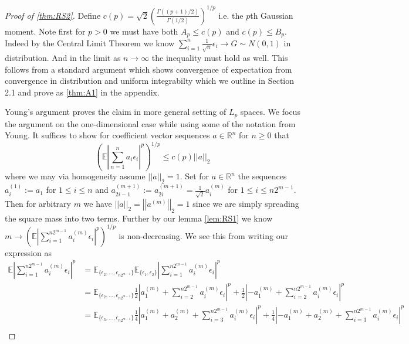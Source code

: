 \documentclass[10pt]{article}
\newcommand{\E}{\mathbb{E}}
\newcommand{\1}{\textbf{1}}
\newcommand{\R}{\mathbb{R}}
\newcommand{\norm}[1]{\left\lvert\left\lvert#1\right\rvert\right\rvert}
\newcommand{\normOne}[1]{\left\lvert#1\right\rvert}
\newcommand{\lparen}{\left(}
\newcommand{\rparen}{\right)}
\theoremstyle{remark}
\theoremstyle{definition}
\begin{document}
\begin{proof}[Proof of \ref{thm:RS2}]
	Define $c(p) = \sqrt{2}(\frac{\Gamma((p+1)/2)}{\Gamma(1/2)})^{1/p}$ i.e. the $p$th Gaussian moment. Note first for $p > 0$ we must have both $A_p \leq c(p)$ and $c(p) \leq B_p$. Indeed by the Central Limit Theorem we know $\sum_{i=1}^n \frac{1}{\sqrt{n}}\epsilon_i \to G \sim N(0,1)$ in distribution. And in the limit as $n \to \infty$ the inequality must hold as well. This follows from a standard argument which shows convergence of expectation from convergence in distribution and uniform integrabilty which we outline in Section 2.1 and prove as \ref{thm:A1} in the appendix.

	Young's argument proves the claim in more general setting of $L_p$ spaces. We focus the argument on the one-dimensional case while using some of the notation from Young. It suffices to show for coefficient vector sequences $a \in \R^n$ for $n \geq 0$ that 
	\begin{equation*}
		\lparen\E\normOne{\sum_{n=1}^{n}a_i\epsilon_i}^p\rparen^{1/p} \leq c(p)\norm{a}_2
	\end{equation*} where we may via homogeneity assume $\norm{a}_2 = 1$. 
	Set for $a \in \R^n$ the sequences $a_i^{(1)} := a_1$ for $1 \leq i \leq n$ and $a_{2i-1}^{(m+1)} := a_{2i}^{(m+1)} = \frac{1}{\sqrt{2}}a_i^{(m)}$ for $1 \leq i \leq n2^{m-1}$. Then for arbitrary $m$ we have $\norm{a}_2 = \norm{a^{(m)}}_2=1$ since we are simply spreading the square mass into two terms. Further by our lemma \ref{lem:RS1} we know $m \to \lparen\E\normOne{\sum_{i=1}^{n2^{m-1}}a_i^{(m)}\epsilon_i}^p\rparen^{1/p}$ is non-decreasing. We see this from writing our expression as
	\begin{align*}
		\E\normOne{\sum_{i=1}^{n2^{m-1}}a_i^{(m)}\epsilon_i}^p &= \E_{\{\epsilon_2,...,\epsilon_{n2^{m-1}}\}}\E_{\{\epsilon_1,\epsilon_2\}}\normOne{\sum_{i=1}^{n2^{m-1}}a_i^{(m)}\epsilon_i}^p \\
		&= \E_{\{\epsilon_2,...,\epsilon_{n2^{m-1}}\}}\frac{1}{2}\normOne{a_1^{(m)}+\sum_{i=2}^{n2^{m-1}}a_i^{(m)}\epsilon_i}^p+\frac{1}{2}\normOne{-a_1^{(m)}+\sum_{i=2}^{n2^{m-1}}a_i^{(m)}\epsilon_i}^p \\
		&= \E_{\{\epsilon_3,...,\epsilon_{n2^{m-1}}\}}\frac{1}{4}\normOne{a_1^{(m)}+a_2^{(m)}+\sum_{i=3}^{n2^{m-1}}a_i^{(m)}\epsilon_i}^p+\frac{1}{4}\normOne{-a_1^{(m)}+a_2^{(m)}+\sum_{i=3}^{n2^{m-1}}a_i^{(m)}\epsilon_i}^p  \\

\end{align*}
\end{proof}
\end{document}
